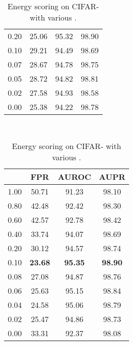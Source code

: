 \documentclass{article}
\begin{document}
\begin{table}[t]
{{\begin{tabular}{c|ccc}
0.20               & 25.06                  & 95.32                  & 98.90 \\
0.10               & 29.21                  & 94.49                  & 98.69 \\
0.07               & 28.67                  & 94.78                  & 98.75 \\
0.05               & 28.72                  & 94.82                  & 98.81 \\ 
0.02               & 27.58                  & 94.93                  & 98.58 \\
0.00               & 25.38                  & 94.22                  & 98.78 \\
\bottomrule[1.5pt]      
\end{tabular}
}
}~~
\parbox{.30\linewidth}{
\centering
\caption{Energy scoring on CIFAR-  with various  .} 
\scriptsize
\vspace{5pt}
{
\begin{tabular}{c|ccc}
\toprule[1.5pt]
            & FPR     & AUROC       & AUPR     \\
\midrule[0.6pt]
1.00               & 50.71                  & 91.23                  & 98.10 \\
0.80               & 42.48                  & 92.42                  & 98.30 \\
0.60               & 42.57                  & 92.78                  & 98.42 \\
0.40               & 33.74                  & 94.07                  & 98.69 \\
0.20               & 30.12                  & 94.57                  & 98.74 \\
\cellcolor{greyC}0.10               & \cellcolor{greyC}\textbf{23.68}                  & \cellcolor{greyC}\textbf{95.35}                  & \cellcolor{greyC}\textbf{98.90} \\
0.08               & 27.08                  & 94.87                  & 98.76 \\
0.06               & 25.63                  & 95.15                  & 98.84 \\
0.04               & 24.58                  & 95.06                  & 98.79 \\
0.02               & 25.47                  & 94.86                  & 98.73 \\
0.00               & 33.31                  & 92.37                  & 98.08 \\
\bottomrule[1.5pt]      
\end{tabular}
}
}
\end{table}
\end{document}
